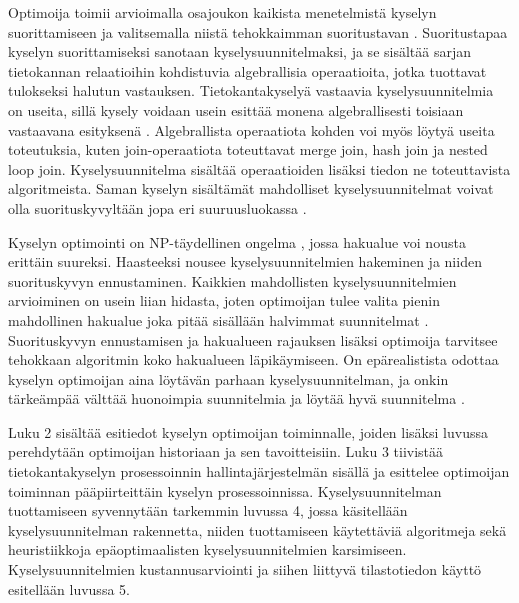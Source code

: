 \documentclass[finnish]{tktltiki2}
\theoremstyle{definition}
\theoremstyle{remark}
\begin{document}
Optimoija toimii arvioimalla osajoukon kaikista menetelmistä kyselyn suorittamiseen ja valitsemalla niistä tehokkaimman suoritustavan \cite{selinger1979access}. Suoritustapaa kyselyn suorittamiseksi sanotaan kyselysuunnitelmaksi, ja se sisältää sarjan tietokannan relaatioihin kohdistuvia algebrallisia operaatioita, jotka tuottavat tulokseksi halutun vastauksen. Tietokantakyselyä vastaavia kyselysuunnitelmia on useita, sillä kysely voidaan usein esittää monena algebrallisesti toisiaan vastaavana esityksenä \cite{jarke1984}. Algebrallista operaatiota kohden voi myös löytyä useita toteutuksia, kuten join-operaatiota toteuttavat merge join, hash join ja nested loop join. Kyselysuunnitelma sisältää operaatioiden lisäksi tiedon ne toteuttavista algoritmeista. Saman kyselyn sisältämät mahdolliset kyselysuunnitelmat voivat olla suorituskyvyltään jopa eri suuruusluokassa \cite{ioannidis1996query, oracle2013refman}. 


Kyselyn optimointi on NP-täydellinen ongelma \cite{ibaraki1984optimal}, jossa hakualue voi nousta erittäin suureksi. Haasteeksi nousee kyselysuunnitelmien hakeminen ja niiden suorituskyvyn ennustaminen. Kaikkien mahdollisten kyselysuunnitelmien arvioiminen on usein liian hidasta, joten optimoijan tulee valita pienin mahdollinen hakualue joka pitää sisällään halvimmat suunnitelmat \cite{chaudhuri1998}. Suorituskyvyn ennustamisen ja hakualueen rajauksen lisäksi optimoija tarvitsee tehokkaan algoritmin koko hakualueen läpikäymiseen. On epärealistista odottaa kyselyn optimoijan aina löytävän parhaan kyselysuunnitelman, ja onkin tärkeämpää välttää huonoimpia suunnitelmia ja löytää hyvä suunnitelma \cite{ramakrishnan2003database}. 

Luku 2 sisältää esitiedot kyselyn optimoijan toiminnalle, joiden lisäksi luvussa perehdytään optimoijan historiaan ja sen tavoitteisiin. Luku 3 tiivistää tietokantakyselyn prosessoinnin hallintajärjestelmän sisällä ja esittelee optimoijan toiminnan pääpiirteittäin kyselyn prosessoinnissa. Kyselysuunnitelman tuottamiseen syvennytään tarkemmin luvussa 4, jossa käsitellään kyselysuunnitelman rakennetta, niiden tuottamiseen käytettäviä algoritmeja sekä heuristiikkoja epäoptimaalisten kyselysuunnitelmien karsimiseen. Kyselysuunnitelmien kustannusarviointi ja siihen liittyvä tilastotiedon käyttö esitellään luvussa 5. 
\end{document}
